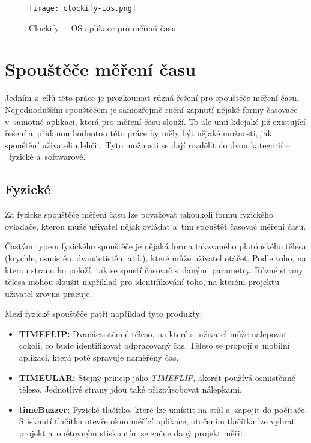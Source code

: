 \begin{figure}[h]
	\centering
	\texttt{[image: clockify-ios.png]}
	\caption{Clockify – iOS aplikace pro měření času \cite{clockify-ios}}
	\label{fig:clockify-ios}
\end{figure}

\section{Spouštěče měření času}\label{tracking-triggers}

Jedním z~cílů této práce je prozkoumat různá řešení pro spouštěče měření času. Nejjednodušším spouštěčem je samozřejmě ruční zapnutí nějaké formy časovače v~samotné aplikaci, která pro měření času slouží. To ale umí kdejaké již existující řešení a~přidanou hodnotou této práce by měly být nějaké možnosti, jak spouštění uživateli ulehčit. Tyto možnosti se dají rozdělit do dvou kategorií – fyzické a~softwarové.

\subsection{Fyzické}

Za fyzické spouštěče měření času lze považovat jakoukoli formu fyzického ovladače, kterou může uživatel nějak ovládat a~tím spouštět časovač měření času.

Častým typem fyzického spouštěče je nějaká forma takzvaného platónského tělesa (krychle, osmistěn, dvanáctistěn, atd.), které může uživatel otáčet. Podle toho, na kterou stranu ho položí, tak se spustí časovač s~danými parametry. Různé strany tělesa mohou sloužit například pro identifikování toho, na kterém projektu uživatel zrovna pracuje.

Mezi fyzické spouštěče patří například tyto produkty:
\begin{itemize}
\item\textbf{TIMEFLIP:} Dvanáctistěnné těleso, na které si uživatel může nalepovat cokoli, co bude identifikovat odpracovaný čas. Těleso se propojí s~mobilní aplikací, která poté spravuje naměřený čas. \cite{timeflip}
\item\textbf{TIMEULAR:} Stejný princip jako \emph{TIMEFLIP}, akorát používá osmistěnné těleso. Jednotlivé strany jdou také přizpůsobovat nálepkami. \cite{timeular}
\item\textbf{timeBuzzer:} Fyzické tlačítko, které lze umístit na stůl a~zapojit do počítače. Stisknutí tlačítka otevře okno měřící aplikace, otočením tlačítka lze vybrat projekt a~opětovným stisknutím se začne daný projekt měřit. \cite{timebuzzer}
\end{itemize}

